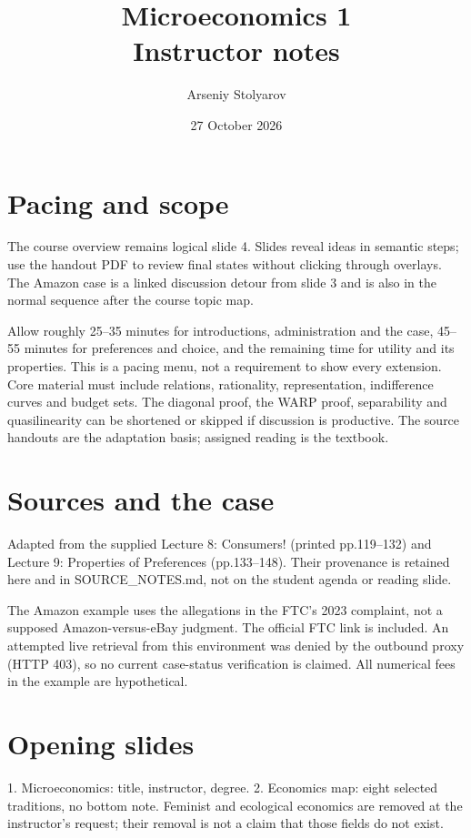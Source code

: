\documentclass[11pt,a4paper]{article}
\title{Microeconomics 1\\Instructor notes}
\author{Arseniy Stolyarov}
\date{27 October 2026}
\begin{document}
\maketitle

\section*{Pacing and scope}
The course overview remains logical slide 4. Slides reveal ideas in semantic steps; use the handout PDF to review final states without clicking through overlays. The Amazon case is a linked discussion detour from slide 3 and is also in the normal sequence after the course topic map.

Allow roughly 25--35 minutes for introductions, administration and the case, 45--55 minutes for preferences and choice, and the remaining time for utility and its properties. This is a pacing menu, not a requirement to show every extension. Core material must include relations, rationality, representation, indifference curves and budget sets. The diagonal proof, the WARP proof, separability and quasilinearity can be shortened or skipped if discussion is productive. The source handouts are the adaptation basis; assigned reading is the textbook.

\section*{Sources and the case}
Adapted from the supplied Lecture 8: Consumers! (printed pp.119--132) and Lecture 9: Properties of Preferences (pp.133--148). Their provenance is retained here and in SOURCE\_NOTES.md, not on the student agenda or reading slide.

The Amazon example uses the allegations in the FTC's 2023 complaint, not a supposed Amazon-versus-eBay judgment. The official FTC link is included. An attempted live retrieval from this environment was denied by the outbound proxy (HTTP 403), so no current case-status verification is claimed. All numerical fees in the example are hypothetical.

\section*{Opening slides}
1. Microeconomics: title, instructor, degree. 2. Economics map: eight selected traditions, no bottom note. Feminist and ecological economics are removed at the instructor's request; their removal is not a claim that those fields do not exist.
\end{document}
